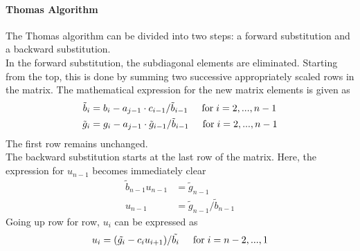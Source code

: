 \documentclass[%
oneside,                 %
final,                   %
10pt]{article}
\begin{document}
\paragraph{Thomas Algorithm}
The Thomas algorithm can be divided into two steps: a forward substitution and a backward substitution.\\
In the forward substitution, the subdiagonal elements are eliminated. Starting from the top, this is done by summing two successive appropriately scaled rows in the matrix. The mathematical expression for the new matrix elements is given as
\begin{equation*}
\begin{aligned}
\tilde{b}_i &= b_i - a_{j-1} \cdot c_{i-1}/ \tilde{b}_{i-1}  \hspace{0.5cm} \mathrm{for} \hspace{0.1cm} i=2,..., n-1 \\
\tilde{g}_i &= g_i - a_{j-1} \cdot \tilde{g}_{i-1} / \tilde{b}_{i-1}  \hspace{0.5cm} \mathrm{for} \hspace{0.1cm} i=2,..., n-1
\end{aligned}
\end{equation*}
The first row remains unchanged. \\
The backward substitution starts at the last row of the matrix. Here, the expression for $u_{n-1}$ becomes immediately clear
\begin{equation*}
\begin{aligned}
\tilde{b}_{n-1} u_{n-1} &= \tilde{g}_{n-1} \\
u_{n-1} &= \tilde{g}_{n-1} / \tilde{b}_{n-1}
\end{aligned}
\end{equation*}
Going up row for row, $u_i$ can be expressed as
\begin{equation*}
u_i = ( \tilde{g_i}-c_i u_{i+1} )/ \tilde{b_i} \hspace{0.5cm} \mathrm{for} \hspace{0.1cm} i=n-2,...,1
\end{equation*}
\end{document}
